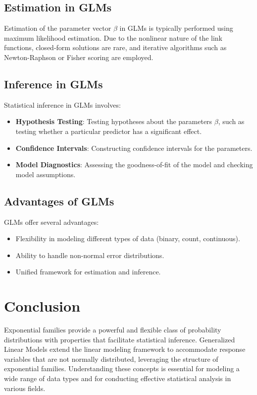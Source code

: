 \documentclass[open=any, 11pt,paper=A4]{scrreprt}
\begin{document}
\subsection{Estimation in GLMs}

Estimation of the parameter vector $\beta$ in GLMs is typically performed using maximum likelihood estimation. Due to the nonlinear nature of the link functions, closed-form solutions are rare, and iterative algorithms such as Newton-Raphson or Fisher scoring are employed.

\subsection{Inference in GLMs}

Statistical inference in GLMs involves:

\begin{itemize}
    \item \textbf{Hypothesis Testing}: Testing hypotheses about the parameters $\beta$, such as testing whether a particular predictor has a significant effect.
    \item \textbf{Confidence Intervals}: Constructing confidence intervals for the parameters.
    \item \textbf{Model Diagnostics}: Assessing the goodness-of-fit of the model and checking model assumptions.
\end{itemize}

\subsection{Advantages of GLMs}

GLMs offer several advantages:

\begin{itemize}
    \item Flexibility in modeling different types of data (binary, count, continuous).
    \item Ability to handle non-normal error distributions.
    \item Unified framework for estimation and inference.
\end{itemize}

\section{Conclusion}

Exponential families provide a powerful and flexible class of probability distributions with properties that facilitate statistical inference. Generalized Linear Models extend the linear modeling framework to accommodate response variables that are not normally distributed, leveraging the structure of exponential families. Understanding these concepts is essential for modeling a wide range of data types and for conducting effective statistical analysis in various fields.
\end{document}

